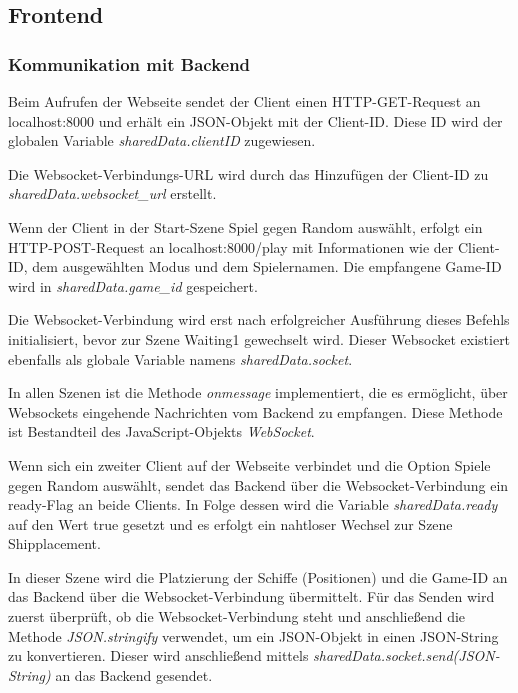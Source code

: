 \documentclass[a4paper, 10pt, conference]{IEEEtran}
\begin{document}
\subsection{Frontend}\label{subsec:frontend}

\subsubsection{Kommunikation mit Backend}\label{subsec:comwithbackend}

Beim Aufrufen der Webseite sendet der Client einen HTTP-GET-Request an \glqq localhost:8000\grqq{} und erhält ein JSON-Objekt mit der Client-ID. Diese ID wird der globalen Variable \textit{sharedData.clientID} zugewiesen.

Die Websocket-Verbindungs-URL wird durch das Hinzufügen der Client-ID zu \textit{sharedData.websocket\_url} erstellt.

Wenn der Client in der Start-Szene \glqq Spiel gegen Random\grqq{} auswählt, erfolgt ein HTTP-POST-Request an \glqq localhost:8000/play\grqq{} mit Informationen wie der Client-ID, dem ausgewählten Modus und dem Spielernamen. Die empfangene Game-ID wird in \textit{sharedData.game\_id} gespeichert.

Die Websocket-Verbindung wird erst nach erfolgreicher Ausführung dieses Befehls initialisiert, bevor zur Szene \glqq Waiting1\grqq{} gewechselt wird. Dieser Websocket existiert ebenfalls als globale Variable namens \textit{sharedData.socket}.

In allen Szenen ist die Methode \textit{onmessage} implementiert, die es ermöglicht, über Websockets eingehende Nachrichten vom Backend zu empfangen. Diese Methode ist Bestandteil des JavaScript-Objekts \textit{WebSocket}.

Wenn sich ein zweiter Client auf der Webseite verbindet und die Option \glqq Spiele gegen Random\grqq{} auswählt, sendet das Backend über die Websocket-Verbindung ein \glqq ready\grqq{}-Flag an beide Clients. In Folge dessen wird die Variable \textit{sharedData.ready} auf den Wert \glqq true\grqq{} gesetzt und es erfolgt ein nahtloser Wechsel zur Szene \glqq Shipplacement\grqq{}.

In dieser Szene wird die Platzierung der Schiffe (Positionen) und die Game-ID an das Backend über die Websocket-Verbindung übermittelt. Für das Senden wird zuerst überprüft, ob die Websocket-Verbindung steht und anschließend die Methode \textit{JSON.stringify} verwendet, um ein JSON-Objekt in einen JSON-String zu konvertieren. Dieser wird anschließend mittels \textit{sharedData.socket.send(JSON-String)} an das Backend gesendet.
\end{document}
